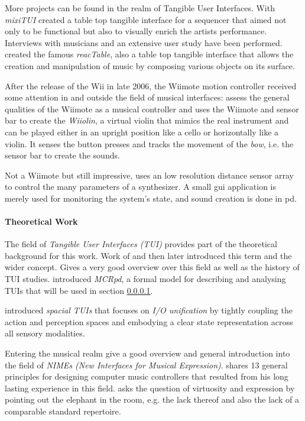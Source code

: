 \documentclass[10pt,a4paper]{scrartcl}
\begin{document}
More projects can be found in the realm of Tangible User Interfaces. With \emph{mixiTUI} \cite{Pedersen2009} created a table top tangible interface for a sequencer that aimed not only to be functional but also to visually enrich the artists performance. Interviews with musicians and an extensive user study have been performed. \cite{Jorda2007} created the famous \emph{reacTable}, also a table top tangible interface that allows the creation and manipulation of music by composing various objects on its surface. 

After the release of the Wii in late 2006, the Wiimote motion controller received some attention in and outside the field of musical interfaces: 
\cite{Kiefer2008} assess the general qualities of the Wiimote as a musical controller and \cite{Miller2010} uses the Wiimote and sensor bar to create the \emph{Wiiolin}, a virtual violin that mimics the real instrument and can be played either in an upright position like a cello or horizontally like a violin. It senses the button presses and tracks the movement of the \emph{bow}, i.e. the sensor bar to create the sounds.

Not a Wiimote but still impressive, \cite{Miyama2010} uses an low resolution distance sensor array to control the many parameters of a synthesizer. A small gui application is merely used for monitoring the system's state, and sound creation is done in pd.


\paragraph{Theoretical Work}
The field of \emph{Tangible User Interfaces (TUI)} provides part of the theoretical background for this work. Work of \cite{Fitzmaurice1995} and then later \cite{Ishii1997} introduced this term and the wider concept. \cite{Shaer2009} Gives a very good overview over this field as well as the history of TUI studies. \cite{Ullmer2000} introduced \emph{MCRpd}, a formal model for describing and analysing TUIs that will be used in section \ref{}.

\cite{Sharlin2004} introduced \emph{spacial TUIs} that focuses on \emph{I/O unification} by tightly coupling the action and perception spaces and embodying a clear state representation across all sensory modalities.


Entering the musical realm \cite{Fels2011} give a good overview and general introduction into the field of \emph{NIMEs (New Interfaces for Musical Expression)}. \cite{Cook2001} shares 13 general principles for designing computer music controllers that resulted from his long lasting experience in this field. \cite{Dobrian2006} asks the question of virtuosity and expression by pointing out the elephant in the room, e.g. the lack thereof and also the lack of a comparable standard repertoire. 
\end{document}
